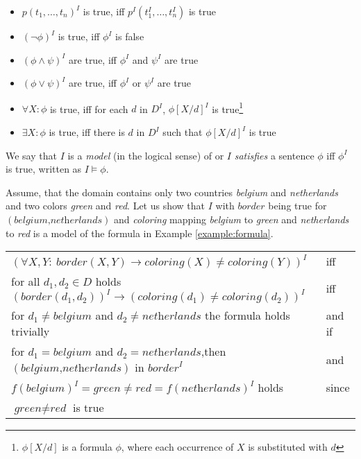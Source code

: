 \begin{itemize}
  \item $p(t_1,\dots,t_n)^I$ is true, iff $p^I(t_1^I,\dots,t_n^I)$ is true
  \item $(\lnot \phi)^I$ is true, iff $\phi^I$ is false
  \item $(\phi \wedge \psi)^I$ are true, iff $\phi^I$ and $\psi^I$ are true
  \item $(\phi \vee \psi)^I$ are true, iff $\phi^I$ or $\psi^I$ are true
  \item $\forall X: \phi$ is true, iff for each $d$ in $D^I$, $\phi[X/d]^I$ is true\footnote{$\phi[X/d]$ is a formula $\phi$, where each occurrence of $X$ is substituted with $d$}
  \item $\exists X: \phi$ is true, iff there is $d$ in $D^I$ such that $\phi[X/d]^I$ is true
\end{itemize}

We say that $I$ is a \textit{model} (in the logical sense) of or $I$ \textit{satisfies} a sentence $\phi$ iff $\phi^I$ is true, written as $I \models \phi$.

\begin{example}
  Assume, that the domain contains only two countries \textit{belgium} and \textit{netherlands} and two colors \textit{green} and \textit{red}. Let us show that $I$ with $\textit{border}$ being true for $(\textit{belgium,netherlands})$ and \textit{coloring} mapping \textit{belgium} to \textit{green} and \textit{netherlands} to \textit{red} is a model of the formula in Example \ref{example:formula}.

  \begin{tabular}{l l}
$(\forall X,Y{:}~\textit{border}(X,Y) \rightarrow \textit{coloring}(X) \neq \textit{coloring}(Y))^I$ & iff \\
for all $d_1,d_2 \in D$ holds $(\textit{border}(d_1,d_2))^I \rightarrow (\textit{coloring}(d_1) \neq \textit{coloring}(d_2))^I$ & iff \\
for $d_1 \neq \textit{belgium}$ and $d_2 \neq \textit{netherlands}$  the formula holds trivially & and if\\
for $d_1  = \textit{belgium}$ and $d_2 = \textit{netherlands}$,then $(\textit{belgium,netherlands})$ in $\textit{border}^I$ & and\\ 
      $f(\textit{belgium})^I = \textit{green} \neq \textit{red} = f(\textit{netherlands})^I$ holds & since \\
$\textit{green} \neq \textit{red}$  is true &
  \end{tabular}
\end{example}


